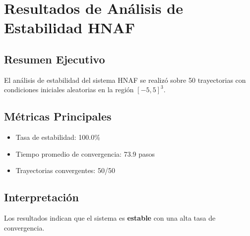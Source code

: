 \section{Resultados de Análisis de Estabilidad HNAF}

\subsection{Resumen Ejecutivo}
El análisis de estabilidad del sistema HNAF se realizó sobre 50 trayectorias con condiciones iniciales aleatorias en la región $[-5, 5]^3$.

\subsection{Métricas Principales}
\begin{itemize}
\item Tasa de estabilidad: 100.0\%
\item Tiempo promedio de convergencia: 73.9 pasos
\item Trayectorias convergentes: 50/50
\end{itemize}

\subsection{Interpretación}
Los resultados indican que el sistema es \textbf{estable} con una alta tasa de convergencia.
